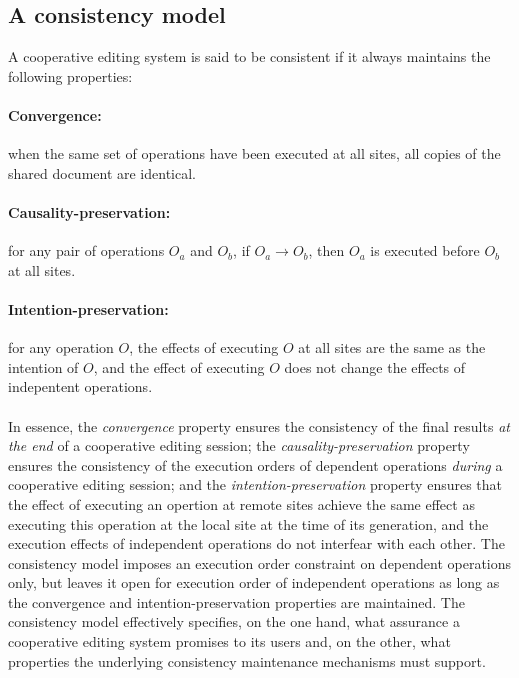\documentclass[11pt,a4paper]{article}
\begin{document}
\subsection{A consistency model}
A cooperative editing system is said to be consistent if it always maintains the following properties:
\paragraph{Convergence:} when the same set of operations have been executed at all sites, all copies of the shared document are identical.
\paragraph{Causality-preservation:} for any pair of operations $O_a$ and $O_b$, if $O_a \rightarrow O_b$, then $O_a$ is executed before $O_b$ at all sites.
\paragraph{Intention-preservation:} for any operation $O$, the effects of executing $O$ at all sites are the same as the intention of $O$, and the effect of executing $O$ does not change the effects of indepentent operations.

\paragraph{}
In essence, the \emph{convergence} property ensures the consistency of the final results \emph{at the end} of a cooperative editing session; the \emph{causality-preservation} property ensures the consistency of the execution orders of dependent operations \emph{during} a cooperative editing session; and the \emph{intention-preservation} property ensures that the effect of executing an opertion at remote sites achieve the same effect as executing this operation at the local site at the time of its generation, and the execution effects of independent operations do not interfear with each other. The consistency model imposes an execution order constraint on dependent operations only, but leaves it open for execution order of independent operations as long as the convergence and intention-preservation properties are maintained. The consistency model effectively specifies, on the one hand, what assurance a cooperative editing system promises to its users and, on the other, what properties the underlying consistency maintenance mechanisms must support.
\end{document}
